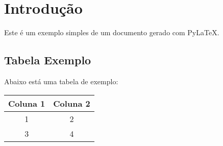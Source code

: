 \documentclass{article}%
\begin{document}
%
\normalsize%
\section{Introdução}%
\label{sec:Introduo}%
Este é um exemplo simples de um documento gerado com PyLaTeX. %
\subsection{Tabela Exemplo}%
\label{subsec:TabelaExemplo}%
Abaixo está uma tabela de exemplo:%
\begin{tabular}{c|c}%
\hline%
Coluna 1&Coluna 2\\%
\hline%
1&2\\%
3&4\\%
\hline%
\end{tabular}

%
\end{document}
